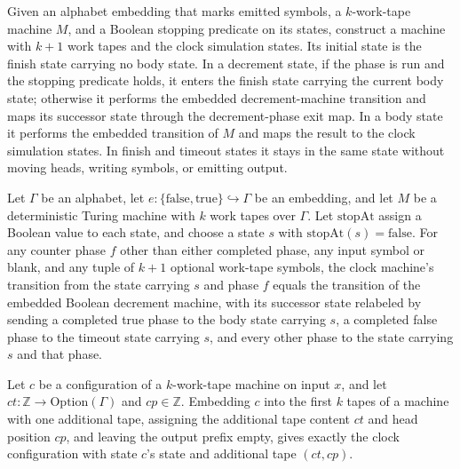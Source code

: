 \begin{definition}
\label{Turing.sc_clockTM}
\leanok
{}
Given an alphabet embedding that marks emitted symbols, a $k$-work-tape machine $M$, and
a Boolean stopping predicate on its states, construct a machine with $k+1$ work tapes
and the clock simulation states. Its initial state is the finish state carrying no body
state. In a decrement state, if the phase is run and the stopping predicate holds, it
enters the finish state carrying the current body state; otherwise it performs the
embedded decrement-machine transition and maps its successor state through the
decrement-phase exit map. In a body state it performs the embedded transition of $M$ and
maps the result to the clock simulation states. In finish and timeout states it stays in
the same state without moving heads, writing symbols, or emitting output.
\end{definition}

\begin{theorem}
\label{Turing.sc_agree}
\leanok
{}
Let $\Gamma$ be an alphabet, let
$e:\{\mathrm{false},\mathrm{true}\}\hookrightarrow\Gamma$ be an embedding, and let $M$
be a deterministic Turing machine with $k$ work tapes over $\Gamma$. Let
$\mathrm{stopAt}$ assign a Boolean value to each state, and choose a state $s$ with
$\mathrm{stopAt}(s)=\mathrm{false}$. For any counter phase $f$ other than either
completed phase, any input symbol or blank, and any tuple of $k+1$ optional work-tape
symbols, the clock machine's transition from the state carrying $s$ and phase $f$ equals
the transition of the embedded Boolean decrement machine, with its successor state
relabeled by sending a completed true phase to the body state carrying $s$, a completed
false phase to the timeout state carrying $s$, and every other phase to the state
carrying $s$ and that phase.
\end{theorem}

\begin{theorem}
\label{Turing.sc_layout}
\leanok
{}
Let $c$ be a configuration of a $k$-work-tape machine on input $x$, and let $ct:\mathbb
Z\to\mathrm{Option}(\Gamma)$ and $cp\in\mathbb Z$. Embedding $c$ into the first $k$
tapes of a machine with one additional tape, assigning the additional tape content $ct$
and head position $cp$, and leaving the output prefix empty, gives exactly the clock
configuration with state $c$'s state and additional tape $(ct,cp)$.
\end{theorem}

